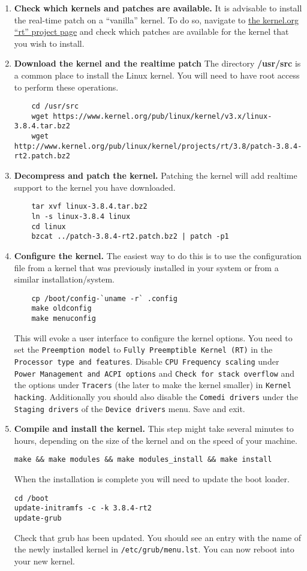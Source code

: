\begin{enumerate}
\item \textbf{Check which kernels and patches are available.}
  It is advisable to install the real-time patch on a ``vanilla''
  kernel. To do so, navigate to
  \href{http://www.kernel.org/pub/linux/kernel/projects/rt/}{the
      kernel.org ``rt'' project page} and check which patches are
  available for the kernel that you wish to install. 
\item \textbf{Download the kernel and the realtime patch} The
  directory \textbf{/usr/src} is a common place to install the Linux
  kernel. You will need to have root access to perform these
  operations.
  \begin{lstlisting}
    cd /usr/src
    wget https://www.kernel.org/pub/linux/kernel/v3.x/linux-3.8.4.tar.bz2
    wget http://www.kernel.org/pub/linux/kernel/projects/rt/3.8/patch-3.8.4-rt2.patch.bz2
  \end{lstlisting}
\item \textbf{Decompress and patch the kernel.} Patching the kernel
  will add realtime support to the kernel you have downloaded.
  \begin{lstlisting}
    tar xvf linux-3.8.4.tar.bz2
    ln -s linux-3.8.4 linux
    cd linux
    bzcat ../patch-3.8.4-rt2.patch.bz2 | patch -p1
  \end{lstlisting}
\item \textbf{Configure the kernel.} The easiest way to do this is to
  use the configuration file from a kernel that was previously
  installed in your system or from a similar installation/system.
  \begin{lstlisting}
    cp /boot/config-`uname -r` .config
    make oldconfig
    make menuconfig
  \end{lstlisting}
  This will evoke a user interface to configure the kernel options.
You need to set the \texttt{Preemption model} to \texttt{Fully
  Preemptible Kernel (RT)} in the \texttt{Processor type and
  features}. Disable \texttt{CPU Frequency scaling} under
\texttt{Power Management and ACPI options} and \texttt{Check for
  stack overflow} and the options under \texttt{Tracers} (the later to
make the kernel smaller) in \texttt{Kernel hacking}. Additionally you
should also disable the \texttt{Comedi drivers} under the
\texttt{Staging drivers} of the \texttt{Device drivers} menu. Save and
exit.
\item \textbf{Compile and install the kernel.} This step might take several
  minutes to hours, depending on the size of the kernel and on the
  speed of your machine.
\begin{lstlisting}
make && make modules && make modules_install && make install
\end{lstlisting}
When the installation is complete you will need to update the boot loader.
\begin{lstlisting}
cd /boot
update-initramfs -c -k 3.8.4-rt2
update-grub
\end{lstlisting}
Check that grub has been updated. You should see an entry with the
name of the newly installed kernel in
\texttt{/etc/grub/menu.lst}. You can now reboot into your new kernel.
\end{enumerate}

